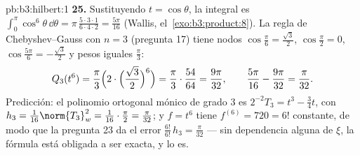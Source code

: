 \begin{solution}{pb:b3:hilbert:1}
\textbf{25.} Sustituyendo $t = \cos\theta$, la integral es
$\int_0^\pi\cos^6\theta\,\dd\theta =
\pi\,\frac{5\cdot3\cdot1}{6\cdot4\cdot2} = \frac{5\pi}{16}$
(Wallis, el~\cref{exo:b3:product:8}). La regla de Chebyshev--Gauss con
$n = 3$ (pregunta 17) tiene nodos
$\cos\frac\pi6 = \frac{\sqrt3}2$, $\cos\frac\pi2 = 0$,
$\cos\frac{5\pi}6 = -\frac{\sqrt3}2$ y pesos iguales
$\frac\pi3$:
\[
Q_3(t^6) = \frac\pi3\Bigl(2\cdot\Bigl(\frac{\sqrt3}2
\Bigr)^{6}\Bigr) = \frac\pi3\cdot\frac{54}{64}
= \frac{9\pi}{32},
\qquad
\frac{5\pi}{16} - \frac{9\pi}{32} = \frac\pi{32} .
\]
Predicción: el polinomio ortogonal mónico de grado $3$ es
$2^{-2}T_3 = t^3 - \frac34t$, con $h_3 =
\frac1{16}\norm{T_3}_w^2 = \frac1{16}\cdot\frac\pi2 =
\frac\pi{32}$; y $f = t^6$ tiene $f^{(6)} = 720 =
6!$ constante, de modo que la pregunta 23 da el error
$\frac{6!}{6!}\,h_3 =
\frac\pi{32}$ --- sin dependencia alguna de $\xi$, la fórmula está
obligada a ser exacta, y lo es.
\end{solution}
